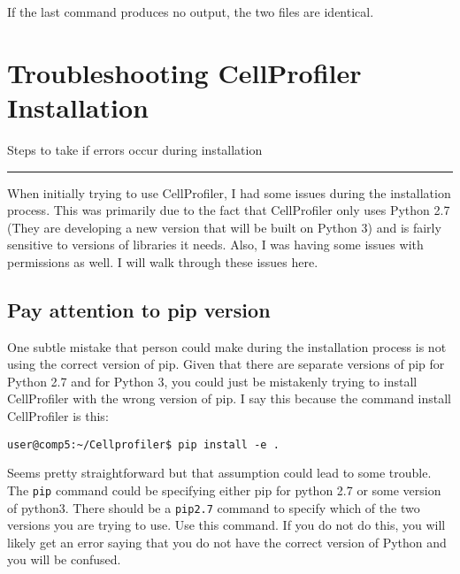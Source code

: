 \documentclass[
  letterpaper,
  DIV=11,
  numbers=noendperiod]{scrreprt}
\begin{document}
If the last command produces no output, the two files are identical.

\hypertarget{troubleshooting-cellprofiler-installation}{%
\chapter{Troubleshooting CellProfiler
Installation}\label{troubleshooting-cellprofiler-installation}}

Steps to take if errors occur during installation

\begin{center}\rule{0.5\linewidth}{0.5pt}\end{center}

When initially trying to use CellProfiler, I had some issues during the
installation process. This was primarily due to the fact that
CellProfiler only uses Python 2.7 (They are developing a new version
that will be built on Python 3) and is fairly sensitive to versions of
libraries it needs. Also, I was having some issues with permissions as
well. I will walk through these issues here.

\hypertarget{pay-attention-to-pip-version}{%
\section*{\texorpdfstring{\textbf{Pay attention to pip
version}}{Pay attention to pip version}}\label{pay-attention-to-pip-version}}


One subtle mistake that person could make during the installation
process is not using the correct version of pip. Given that there are
separate versions of pip for Python 2.7 and for Python 3, you could just
be mistakenly trying to install CellProfiler with the wrong version of
pip. I say this because the command install CellProfiler is this:

\begin{verbatim}
user@comp5:~/Cellprofiler$ pip install -e .
\end{verbatim}

Seems pretty straightforward but that assumption could lead to some
trouble. The \texttt{pip} command could be specifying either pip for
python 2.7 or some version of python3. There should be a \texttt{pip2.7}
command to specify which of the two versions you are trying to use. Use
this command. If you do not do this, you will likely get an error saying
that you do not have the correct version of Python and you will be
confused.
\end{document}
